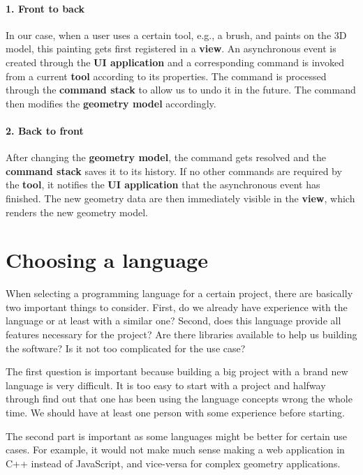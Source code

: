 \paragraph{1. Front to back}

In our case, when a user uses a certain tool, e.g., a brush, and paints on the 3D model, this painting gets first registered in a \textbf{view}.
An asynchronous event is created through the \textbf{UI application} and a corresponding command is invoked from a current \textbf{tool} according to its properties.
The command is processed through the \textbf{command stack} to allow us to undo it in the future.
The command then modifies the \textbf{geometry model} accordingly.

\paragraph{2. Back to front}

After changing the \textbf{geometry model}, the command gets resolved and the \textbf{command stack} saves it to its history.
If no other commands are required by the \textbf{tool}, it notifies the \textbf{UI application} that the asynchronous event has finished.
The new geometry data are then immediately visible in the \textbf{view}, which renders the new geometry model.

\section{Choosing a language}

When selecting a programming language for a certain project, there are basically two important things to consider.
First, do we already have experience with the language or at least with a similar one?
Second, does this language provide all features necessary for the project?
Are there libraries available to help us building the software?
Is it not too complicated for the use case?

The first question is important because building a big project with a brand new language is very difficult.
It is too easy to start with a project and halfway through find out that one has been using the language concepts wrong the whole time.
We should have at least one person with some experience before starting.

The second part is important as some languages might be better for certain use cases.
For example, it would not make much sense making a web application in C++ instead of JavaScript, and vice-versa for complex geometry applications.

